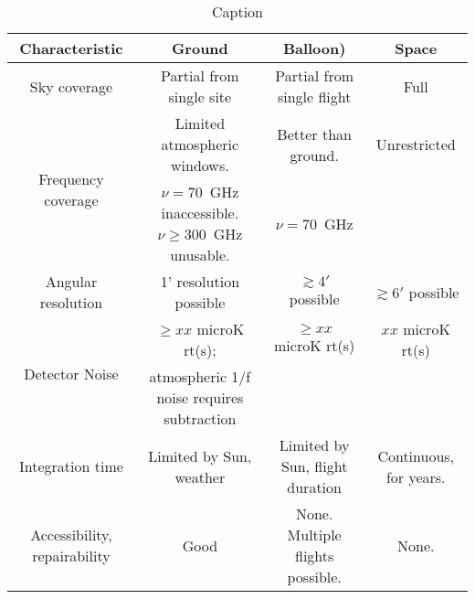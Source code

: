 \documentclass[PICOReport.tex]{subfiles}
\begin{document}
\begin{table}[t]
\begin{adjustbox}{width=1\textwidth,center}
\begin{tabular}{|c|c|c|c|}
\hline
\bf{Characteristic} & {\bf Ground} & {\bf Balloon)} & {\bf Space}  \\ \hline
Sky coverage & Partial from single site & Partial from single flight & Full \\ \hline
\multirow{2}{*}{Frequency coverage} & Limited atmospheric windows.  & Better than ground.  &  Unrestricted \\  
                                     & $\nu=70$~GHz inaccessible. $\nu \ge 300$~GHz unusable. & $\nu=70$~GHz & \\ \hline
                           
Angular resolution  & 1' resolution possible & $\gtrsim 4'$ possible & $\gtrsim 6'$ possible \\ \hline
\multirow{2}{*}{Detector Noise} & $\ge xx$ microK rt(s);  & $\ge xx$ microK rt(s)  &  $ xx$ microK rt(s) \\  
                                     & atmospheric 1/f noise requires subtraction &  & \\ \hline
Integration time  & Limited by Sun, weather & Limited by Sun, flight duration & Continuous, for years.\\ \hline
Accessibility, repairability & Good & None.  Multiple flights possible.& None.\\
\hline
\end{tabular}
\end{adjustbox}
\vspace{-0.13in}
\caption{ \small \setlength{\baselineskip}{0.95\baselineskip}
Caption
\label{tab:comparison} }
\vspace{-0.05in}
\end{table}


\vskip 5pt
\end{document}
